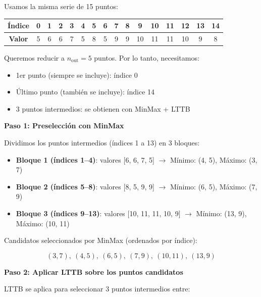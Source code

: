 Usamos la misma serie de 15 puntos:

\begin{center}
\begin{tabular}{|c|c|c|c|c|c|c|c|c|c|c|c|c|c|c|c|}
\hline
\textbf{Índice} & 0 & 1 & 2 & 3 & 4 & 5 & 6 & 7 & 8 & 9 & 10 & 11 & 12 & 13 & 14 \\
\hline
\textbf{Valor} & 5 & 6 & 6 & 7 & 5 & 8 & 5 & 9 & 9 & 10 & 11 & 11 & 10 & 9 & 8 \\
\hline
\end{tabular}
\end{center}

Queremos reducir a $n_{\text{out}} = 5$ puntos. Por lo tanto, necesitamos:

\begin{itemize}
    \item 1er punto (siempre se incluye): índice 0
    \item Último punto (también se incluye): índice 14
    \item 3 puntos intermedios: se obtienen con MinMax + LTTB
\end{itemize}

\bigskip

\textbf{Paso 1: Preselección con MinMax}

Dividimos los puntos intermedios (índices 1 a 13) en 3 bloques:

\begin{itemize}
    \item \textbf{Bloque 1 (índices 1--4)}: valores [6, 6, 7, 5]  
    $\rightarrow$ Mínimo: (4, 5), Máximo: (3, 7)
    
    \item \textbf{Bloque 2 (índices 5--8)}: valores [8, 5, 9, 9]  
    $\rightarrow$ Mínimo: (6, 5), Máximo: (7, 9)
    
    \item \textbf{Bloque 3 (índices 9--13)}: valores [10, 11, 11, 10, 9]  
    $\rightarrow$ Mínimo: (13, 9), Máximo: (10, 11)
\end{itemize}

\noindent Candidatos seleccionados por MinMax (ordenados por índice):

\[
(3,7),\ (4,5),\ (6,5),\ (7,9),\ (10,11),\ (13,9)
\]

\bigskip

\textbf{Paso 2: Aplicar LTTB sobre los puntos candidatos}

LTTB se aplica para seleccionar 3 puntos intermedios entre:

